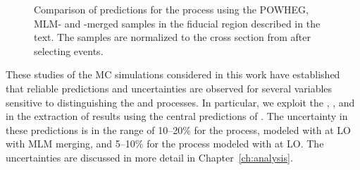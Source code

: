 \begin{figure}[htbp]
  \caption[Comparison of predictions for \QCDWZ production including hadronization effects]
  {Comparison of predictions for the \QCDWZ process using the POWHEG, \MG MLM- and \FxFx-merged samples 
  in the fiducial region described in the text. The samples are normalized to the cross section
  from \MG after selecting \WZjj events.}
 \label{fig:qcdwzHadronization}
\end{figure}

These studies of the MC simulations considered in this work have established
that reliable predictions and uncertainties are observed for several variables sensitive to 
distinguishing the \EWWZ and \QCDWZ processes. In particular, we exploit the 
\etajj, \mjj, and \zepl in the extraction of results using the central predictions
of \MG. The uncertainty in these predictions is in the range of 10--20\% for
the \QCDWZ process, modeled with \MG at LO with MLM merging, and 5--10\% for
the \EWWZ process modeled with \MG at LO. The uncertainties are discussed in
more detail in Chapter~\ref{ch:analysis}.
